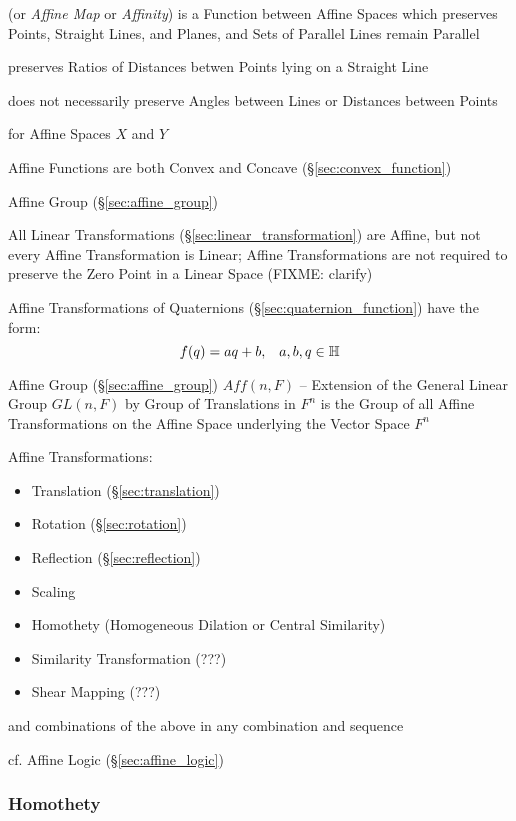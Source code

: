 (or \emph{Affine Map} or \emph{Affinity}) is a Function between Affine
Spaces which preserves Points, Straight Lines, and Planes, and Sets of
Parallel Lines remain Parallel

preserves Ratios of Distances betwen Points lying on a Straight Line

does not necessarily preserve Angles between Lines or Distances
between Points

for Affine Spaces $X$ and $Y$

Affine Functions are both Convex and Concave (\S\ref{sec:convex_function})

\fist Affine Group (\S\ref{sec:affine_group})

\fist All Linear Transformations (\S\ref{sec:linear_transformation}) are
Affine, but not every Affine Transformation is Linear; Affine Transformations
are not required to preserve the Zero Point in a Linear Space (FIXME: clarify)

Affine Transformations of Quaternions (\S\ref{sec:quaternion_function}) have
the form:
\[
  f(q) = aq + b, \;\;\; a,b,q \in \mathbb{H}
\]

Affine Group (\S\ref{sec:affine_group}) $Aff(n,F)$ -- Extension of the General
Linear Group $GL(n,F)$ by Group of Translations in $F^n$ is the Group of all
Affine Transformations on the Affine Space underlying the Vector Space $F^n$

Affine Transformations:
\begin{itemize}
\item Translation (\S\ref{sec:translation})
\item Rotation (\S\ref{sec:rotation})
\item Reflection (\S\ref{sec:reflection})
\item Scaling
\item Homothety (Homogeneous Dilation or Central Similarity)
\item Similarity Transformation (???)
\item Shear Mapping (???)
\end{itemize}
and combinations of the above in any combination and sequence

cf. Affine Logic (\S\ref{sec:affine_logic})



\subsubsection{Homothety}\label{sec:homothety}


